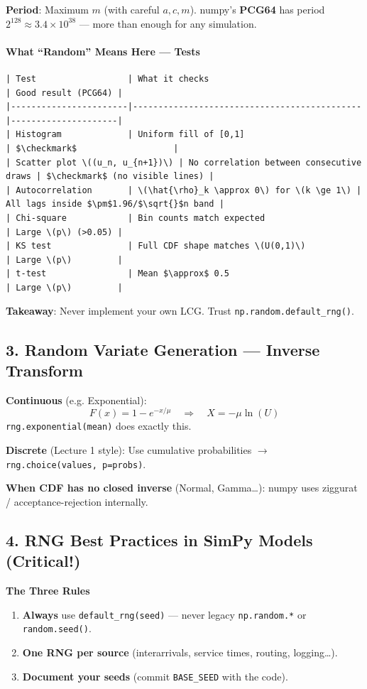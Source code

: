 \documentclass[11pt]{article}
\begin{document}
\textbf{Period}: Maximum \(m\) (with careful \(a,c,m\)).  
numpy's \textbf{PCG64} has period \(2^{128} \approx 3.4 \times 10^{38}\) --- more than enough for any simulation.

\paragraph*{What ``Random'' Means Here --- Tests}
\begin{verbatim}
| Test                  | What it checks                              | Good result (PCG64) |
|-----------------------|---------------------------------------------|---------------------|
| Histogram             | Uniform fill of [0,1]                       | $\checkmark$                   |
| Scatter plot \((u_n, u_{n+1})\) | No correlation between consecutive draws | $\checkmark$ (no visible lines) |
| Autocorrelation       | \(\hat{\rho}_k \approx 0\) for \(k \ge 1\) | All lags inside $\pm$1.96/$\sqrt{}$n band |
| Chi-square            | Bin counts match expected                   | Large \(p\) (>0.05) |
| KS test               | Full CDF shape matches \(U(0,1)\)           | Large \(p\)         |
| t-test                | Mean $\approx$ 0.5                                  | Large \(p\)         |
\end{verbatim}

\textbf{Takeaway}: Never implement your own LCG. Trust \texttt{np.random.default\_rng()}.

\subsection*{3. Random Variate Generation --- Inverse Transform}
\textbf{Continuous} (e.g. Exponential):
\[
F(x) = 1 - e^{-x/\mu} \quad \Rightarrow \quad X = -\mu \ln(U)
\]
\texttt{rng.exponential(mean)} does exactly this.

\textbf{Discrete} (Lecture 1 style):
Use cumulative probabilities $\rightarrow$ \texttt{rng.choice(values, p=probs)}.

\textbf{When CDF has no closed inverse} (Normal, Gamma\ldots{}):  
numpy uses ziggurat / acceptance-rejection internally.

\subsection*{4. RNG Best Practices in SimPy Models (Critical!)}

\textbf{The Three Rules}
\begin{enumerate}[leftmargin=*]
\item \textbf{Always} use \texttt{default\_rng(seed)} --- never legacy \texttt{np.random.*} or \texttt{random.seed()}.
\item \textbf{One RNG per source} (interarrivals, service times, routing, logging\ldots{}).
\item \textbf{Document your seeds} (commit \texttt{BASE\_SEED} with the code).
\end{enumerate}
\end{document}
